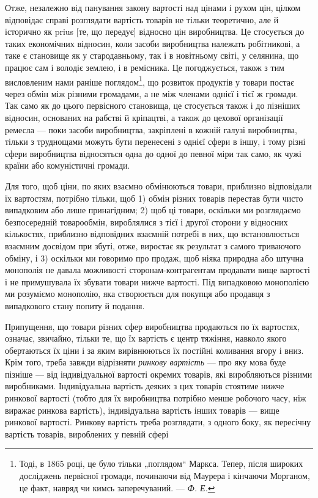 Отже, незалежно від панування закону вартості над цінами
і рухом цін, цілком відповідає справі розглядати вартість товарів
не тільки теоретично, але й історично як prius [те, що передує]
відносно цін виробництва. Це стосується до таких економічних
відносин, коли засоби виробництва належать робітникові,
а таке є становище як у стародавньому, так і в новітньому
світі, у селянина, що працює сам і володіє землею, і в ремісника.
Це погоджується, також з тим висловленим нами раніше
поглядом\footnote{
Тоді, в 1865 році, це було тільки „поглядом“ Маркса. Тепер, після широких
досліджень первісної громади, починаючи від Маурера і кінчаючи Морганом,
це факт, навряд чи кимсь заперечуваний. — \emph{Ф. Е.}
}, що розвиток продуктів у товари постає через обмін
між різними громадами, а не між членами однієї і тієї ж громади.
Так само як до цього первісного становища, це стосується
також і до пізніших відносин, основаних на рабстві
й кріпацтві, а також до цехової організації ремесла — поки засоби
виробництва, закріплені в кожній галузі виробництва, тільки
з труднощами можуть бути перенесені з однієї сфери в іншу,
і тому різні сфери виробництва відносяться одна до одної
до певної міри так само, як чужі країни або комуністичні
громади.

Для того, щоб ціни, по яких взаємно обмінюються товари,
приблизно відповідали їх вартостям, потрібно тільки, щоб 1) обмін
різних товарів перестав бути чисто випадковим або лише
принагідним; 2) щоб ці товари, оскільки ми розглядаємо безпосередній
товарообмін, вироблялися з тієї і другої сторони у відносних
кількостях, приблизно відповідних взаємній потребі в них,
що встановлюється взаємним досвідом при збуті, отже, виростає
як результат з самого триваючого обміну, і 3) оскільки ми
говоримо про продаж, щоб ніяка природна або штучна монополія
не давала можливості сторонам-контрагентам продавати
вище вартості і не примушувала їх збувати товари нижче вартості.
Під випадковою монополією ми розуміємо монополію, яка створюється
для покупця або продавця з випадкового стану попиту
й подання.

Припущення, що товари різних сфер виробництва продаються
по їх вартостях, означає, звичайно, тільки те, що їх вартість
є центр тяжіння, навколо якого обертаються їх ціни і за яким
вирівнюються їх постійні коливання вгору і вниз. Крім того,
треба завжди відрізняти \emph{ринкову вартість} — про яку мова буде
пізніше — від індивідуальної вартості окремих товарів, які виробляються
різними виробниками. Індивідуальна вартість деяких
з цих товарів стоятиме нижче ринкової вартості (тобто для їх
виробництва потрібно менше робочого часу, ніж виражає ринкова
вартість), індивідуальна вартість інших товарів — вище
ринкової вартості. Ринкову вартість треба розглядати, з одного
боку, як пересічну вартість товарів, вироблених у певній сфері
\parbreak{}  %
